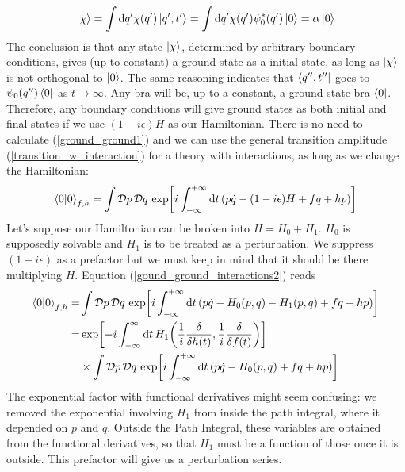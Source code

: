 \begin{equation}
   \ket{\chi} =\int\dd q^\prime \chi(q^\prime)\ket{q^\prime,t^\prime}=\int\dd q^\prime \chi(q^\prime)\psi_0^*(q^\prime)\ket{0}=\alpha\ket{0}
\end{equation}
 The conclusion is that any state $\ket{\chi}$, determined by arbitrary boundary conditions, gives (up to constant) a ground state as a initial state, as long as $\ket{\chi}$ is not orthogonal to $\ket{0}$. The same reasoning indicates that $\bra{q^{\prime\prime},t^{\prime\prime}}$ goes to $\psi_0(q^{\prime\prime})\bra{0}$ as $t\to\infty$. Any bra will be, up to a constant, a ground state bra $\bra{0}$. Therefore, any boundary conditions will give ground states as both initial and final states if we use $(1-i\epsilon)H$ as our Hamiltonian. There is no need to calculate (\ref{ground_ground1}) and we can use the general transition amplitude (\ref{transition_w_interaction}) for a theory with interactions, as long as we change the Hamiltonian:
\begin{equation}
    \braket{0}_{f,h}=\int\mathcal{D}p\,\mathcal{D}q\,\exp[i\int_{-\infty}^{+\infty}\dd t\, (p\dot{q}-(1-i\epsilon)H+fq+hp)]
    \label{gound_ground_interactions2}
\end{equation}
Let's suppose our Hamiltonian can be broken into $H=H_0+H_1$. $H_0$ is supposedly solvable and $H_1$ is to be treated as a perturbation. We suppress $(1-i\epsilon)$ as a prefactor but we must keep in mind that it should be there multiplying $H$. Equation (\ref{gound_ground_interactions2}) reads
\begin{equation}
    \begin{aligned}
           \braket{0}_{f,h}=&\int\mathcal{D}p\,\mathcal{D}q\,\exp[i\int_{-\infty}^{+\infty}\dd t\, (p\dot{q}-H_0(p,q)-H_1(p,q)+fq+hp)]\\
           =&\exp[-i\int_{-\infty}^{\infty}\dd t\, H_1\qty(\frac{1}{i}\fdv{h(t)},\frac{1}{i}\fdv{f(t)})]\\&\times\int\mathcal{D}p\,\mathcal{D}q\,\exp[i\int_{-\infty}^{+\infty}\dd t\, (p\dot{q}-H_0(p,q)+fq+hp)]
    \end{aligned}
    \label{gound_ground_separable}
\end{equation}
The exponential factor with functional derivatives might seem confusing: we removed the exponential involving $H_1$ from inside the path integral, where it depended on $p$ and $q$. Outside the Path Integral, these variables are obtained from the functional derivatives, so that $H_1$ must be a function of those once it is outside. This prefactor will give us a perturbation series. \\

